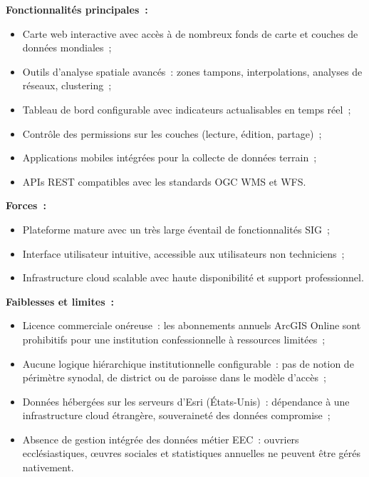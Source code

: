 \documentclass[12pt, a4paper]{report}
\begin{document}
\noindent\textbf{Fonctionnalités principales~:}
\begin{itemize}[itemsep=2pt, topsep=4pt, leftmargin=1.5cm]
  \item Carte web interactive avec accès à de nombreux fonds de carte et couches
    de données mondiales~;
  \item Outils d'analyse spatiale avancés~: zones tampons, interpolations, analyses
    de réseaux, clustering~;
  \item Tableau de bord configurable avec indicateurs actualisables en temps réel~;
  \item Contrôle des permissions sur les couches (lecture, édition, partage)~;
  \item Applications mobiles intégrées pour la collecte de données terrain~;
  \item APIs REST compatibles avec les standards OGC WMS et WFS.
\end{itemize}

\noindent\textbf{Forces~:}
\begin{itemize}[itemsep=2pt, topsep=4pt, leftmargin=1.5cm]
  \item Plateforme mature avec un très large éventail de fonctionnalités SIG~;
  \item Interface utilisateur intuitive, accessible aux utilisateurs non
    techniciens~;
  \item Infrastructure cloud scalable avec haute disponibilité et support
    professionnel.
\end{itemize}

\noindent\textbf{Faiblesses et limites~:}
\begin{itemize}[itemsep=2pt, topsep=4pt, leftmargin=1.5cm]
  \item Licence commerciale onéreuse~: les abonnements annuels ArcGIS Online sont
    prohibitifs pour une institution confessionnelle à ressources limitées~;
  \item Aucune logique hiérarchique institutionnelle configurable~: pas de notion
    de périmètre synodal, de district ou de paroisse dans le modèle d'accès~;
  \item Données hébergées sur les serveurs d'Esri (États-Unis)~: dépendance à une
    infrastructure cloud étrangère, souveraineté des données compromise~;
  \item Absence de gestion intégrée des données métier EEC~: ouvriers
    ecclésiastiques, œuvres sociales et statistiques annuelles ne peuvent être
    gérés nativement.
\end{itemize}
\end{document}
